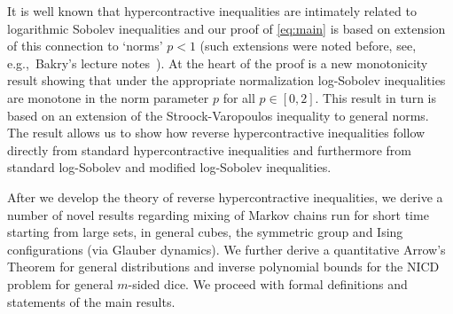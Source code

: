 \documentclass[11pt]{amsart}
\newcommand{\1}{\mathbf{1}}
\theoremstyle{definition}
\theoremstyle{plain}
\theoremstyle{remark}
\numberwithin{equation}{section}
\begin{document}
It is well known that hypercontractive inequalities are intimately related to logarithmic  Sobolev inequalities and our proof of \eqref{eq:main}
 is based on extension of this connection to `norms' $p<1$  (such extensions were noted before, see, e.g.,~Bakry's lecture notes~\cite{Bakry:94}). 
At the heart of the proof is a new monotonicity result showing that under
the appropriate normalization log-Sobolev inequalities are monotone in the norm parameter $p$ for all $p \in [0,2]$.
This result in turn is based on an extension of the Stroock-Varopoulos inequality to general norms. The result allows us to show how reverse hypercontractive inequalities follow directly from
standard hypercontractive inequalities and furthermore from standard log-Sobolev and modified log-Sobolev inequalities.

After we develop the theory of reverse hypercontractive inequalities, we derive a number of novel results regarding mixing of Markov chains run for short time starting from large sets, in general cubes, the symmetric group and Ising configurations (via Glauber dynamics). We further derive a quantitative  Arrow's Theorem for general distributions and  inverse polynomial bounds for the NICD problem for general $m$-sided dice.
We proceed with formal definitions and statements of the main results.
\end{document}
